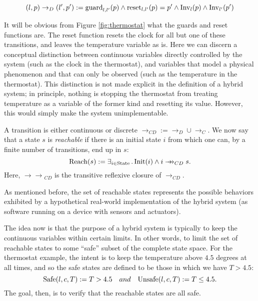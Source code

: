 \documentclass[runningheads]{llncs}
\newcommand{\Exists}[2]{\exists_{#1} \, . \, #2}
\newcommand{\weg}[1]{}
\newcommand{\State}{{\rm State}}
\newcommand{\Inv}{{\rm Inv}}
\newcommand{\Init}{{\rm Init}}
\newcommand{\Unsafe}{{\rm Unsafe}}
\newcommand{\Safe}{{\rm Safe}}
\newcommand{\Reach}{{\rm Reach}}
\newcommand{\guard}{{\rm guard}}
\newcommand{\reset}{{\rm reset}}
\newcommand{\trans}{\rightarrow_{CD}}
\newcommand{\doubleheadrightarrow}{\mathrel{\rightarrow\!\!\!\!\rightarrow}}
\newcommand{\ttrans}{\doubleheadrightarrow_{CD}}
\newcommand{\contrans}{\rightarrow_C}
\newcommand{\distrans}{\rightarrow_D}
\begin{document}
$$ (l,p) \distrans (l',p') := \guard_{l,l'}(p) \wedge \reset_{l,l'}(p)= p' \wedge \Inv_l(p) \wedge \Inv_{l'}(p')$$

\weg{
\begin{code}
  Definition disc_trans: relation State := fun (l, p) (l', p') =>
    guard (l, p) l' /\ reset l l' p = p' /\
    invariant (l, p) /\ invariant (l', p').
\end{code}
}

It will be obvious from Figure \ref{fig:thermostat} what the guards
and reset functions are. The reset function resets the clock for all
but one of these transitions, and leaves the temperature variable as
is. Here we can discern a conceptual distinction between continuous
variables directly controlled by the system (such as the clock in the
thermostat), and variables that model a physical phenomenon and that
can only be observed (such as the temperature in the thermostat). This
distinction is not made explicit in the definition of a hybrid system;
in principle, nothing is stopping the thermostat from treating
temperature as a variable of the former kind and resetting its
value. However, this would simply make the system unimplementable.

\weg{
\begin{code}
Definition thermo_reset (l l': Location) (p: Point): Point :=
  ( match l, l' with
    | Cool, Heat | Heat, Check | Check, Heat => 0
    | _, _ => fst p
    end
  , snd p).
\end{code}
}


A transition is either continuous or discrete $\trans:= \distrans \cup \contrans$. We now say that a state $s$ is \emph{reachable} if there is an initial state $i$ from which one can, by a finite number of transitions, end up in $s$:
$$\Reach(s):=
    \Exists{i\in \State}{\Init(i) \wedge i \ttrans s}.$$
Here, $\ttrans$ is the transitive reflexive closure of $\trans$.

As mentioned before, the set of reachable states represents the
possible behaviors exhibited by a hypothetical real-world
implementation of the hybrid system (as software running on a device
with sensors and actuators).

The idea now is that the purpose of a hybrid system is typically to
keep the continuous variables within certain limits. In other words,
to limit the set of reachable states to some ``safe'' subset of the
complete state space. For the thermostat example, the intent is to
keep the temperature above $4.5$ degrees at all times, and so the safe
states are defined to be those in which we have $T > 4.5$: $$\Safe(l,c,T) := T >4.5 \quad and \quad \Unsafe(l,c,T) := T\leq 4.5.$$
The goal, then, is to verify that the reachable states are all safe.
\end{document}
